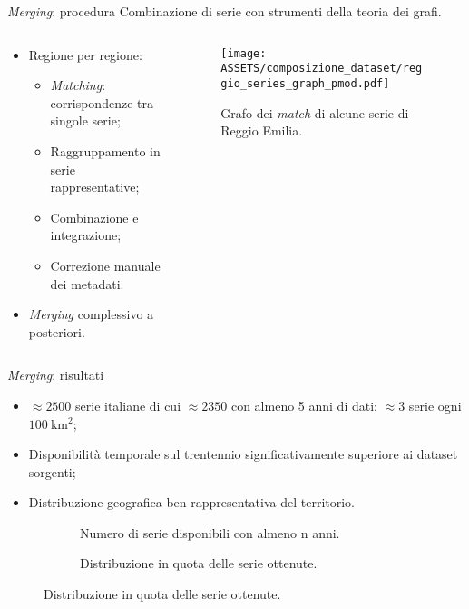 \begin{frame}[t]{\emph{Merging}: procedura}
  Combinazione di serie con strumenti della teoria dei grafi.
  \begin{columns}
    \begin{column}{0.5\textwidth}
      \begin{itemize}
        \item Regione per regione:
          \begin{itemize}
            \item \emph{Matching}: corrispondenze tra singole serie;
            \item Raggruppamento in serie rappresentative;
            \item Combinazione e integrazione;
            \item Correzione manuale dei metadati.
          \end{itemize}
        \item \emph{Merging} complessivo a posteriori.
      \end{itemize}
    \end{column}
    \begin{column}{0.5\textwidth}
      \begin{figure}
        \texttt{[image: ASSETS/composizione\_dataset/reggio\_series\_graph\_pmod.pdf]}
        \caption*{Grafo dei \emph{match} di alcune serie di Reggio Emilia.}
      \end{figure}

    \end{column}
  \end{columns}
\end{frame}

\begin{frame}{\emph{Merging}: risultati}
  \begin{itemize}
    \item \(\approx 2500\) serie italiane di cui \(\approx 2350\) con almeno 5 anni di dati: \(\approx 3\) serie ogni \(\qty{100}{\kilo\meter^2}\);
    \item Disponibilità temporale sul trentennio significativamente superiore ai dataset sorgenti;
    \item Distribuzione geografica ben rappresentativa del territorio.
  \end{itemize}
  \begin{figure}
    \centering
    \small
    \begin{subfigure}[t]{0.45\textwidth}
      \small
      
      \caption*{Numero di serie disponibili con almeno n anni.}
    \end{subfigure}
    \hfill
    \begin{subfigure}[t]{0.45\textwidth}
      \small
      
      \caption*{Distribuzione in quota delle serie ottenute.}
    \end{subfigure}
  \end{figure}
\end{frame}

